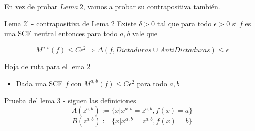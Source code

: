 \documentclass[compress]{beamer}
\begin{document}
\begin{frame}
En vez de probar $Lema \ 2$, vamos a probar su contrapositiva también.

\begin{block}{Lema 2' - contrapositiva de Lema 2}
Existe $\delta > 0$ tal que para todo $\epsilon > 0$ si $f$ es una SCF
neutral entonces para todo $a, b$ vale que

$$ M^{a,b}(f) \leq C \epsilon^2 \Rightarrow \Delta(f, Dictaduras \cup AntiDictaduras) \leq \epsilon$$
\end{block}
\end{frame}

\begin{frame}{Hoja de ruta para el lema 2}
\begin{itemize}
\item Dada una SCF $f$ con $M^{a,b}(f) \leq C \epsilon^2$ para todo $a,b$
\end{itemize}
\end{frame}

\begin{frame}
\end{frame}

\begin{frame}{Prueba del lema 3 - siguen las definiciones}
$$A(z^{a,b}) := \{x | x^{a,b} = z^{a,b}, f(x) = a\}$$
$$B(z^{a,b}) := \{x | x^{a,b} = z^{a,b}, f(x) = b\}$$

\end{frame}

\begin{frame}
\end{frame}
\end{document}
